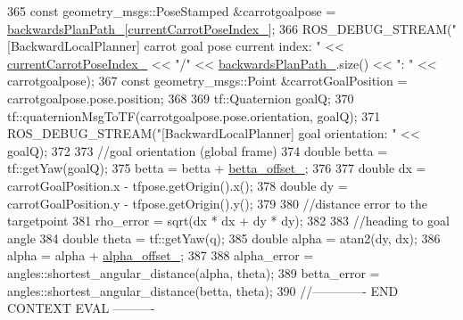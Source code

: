 \begin{DoxyCode}
365                 \textcolor{keyword}{const} geometry\_msgs::PoseStamped &carrotgoalpose = 
      \hyperlink{classcl__move__base__z_1_1backward__local__planner_1_1BackwardLocalPlanner_ad9cde5c85f782cab2ddb4030e3c3f2cf}{backwardsPlanPath\_}[\hyperlink{classcl__move__base__z_1_1backward__local__planner_1_1BackwardLocalPlanner_a2e8f2b78bc97f27c5fa431f3af2261ed}{currentCarrotPoseIndex\_}];
366                 ROS\_DEBUG\_STREAM(\textcolor{stringliteral}{"[BackwardLocalPlanner] carrot goal pose current index: "} << 
      \hyperlink{classcl__move__base__z_1_1backward__local__planner_1_1BackwardLocalPlanner_a2e8f2b78bc97f27c5fa431f3af2261ed}{currentCarrotPoseIndex\_} << \textcolor{stringliteral}{"/"} << \hyperlink{classcl__move__base__z_1_1backward__local__planner_1_1BackwardLocalPlanner_ad9cde5c85f782cab2ddb4030e3c3f2cf}{backwardsPlanPath\_}.size() << \textcolor{stringliteral}{": 
      "} << carrotgoalpose);
367                 \textcolor{keyword}{const} geometry\_msgs::Point &carrotGoalPosition = carrotgoalpose.pose.position;
368 
369                 tf::Quaternion goalQ;
370                 tf::quaternionMsgToTF(carrotgoalpose.pose.orientation, goalQ);
371                 ROS\_DEBUG\_STREAM(\textcolor{stringliteral}{"[BackwardLocalPlanner] goal orientation: "} << goalQ);
372 
373                 \textcolor{comment}{//goal orientation (global frame)}
374                 \textcolor{keywordtype}{double} betta = tf::getYaw(goalQ);
375                 betta = betta + \hyperlink{classcl__move__base__z_1_1backward__local__planner_1_1BackwardLocalPlanner_a07e5f16f6951cca1e6d3483f345d0bb1}{betta\_offset\_};
376 
377                 \textcolor{keywordtype}{double} dx = carrotGoalPosition.x - tfpose.getOrigin().x();
378                 \textcolor{keywordtype}{double} dy = carrotGoalPosition.y - tfpose.getOrigin().y();
379 
380                 \textcolor{comment}{//distance error to the targetpoint}
381                 rho\_error = sqrt(dx * dx + dy * dy);
382 
383                 \textcolor{comment}{//heading to goal angle}
384                 \textcolor{keywordtype}{double} theta = tf::getYaw(q);
385                 \textcolor{keywordtype}{double} alpha = atan2(dy, dx);
386                 alpha = alpha + \hyperlink{classcl__move__base__z_1_1backward__local__planner_1_1BackwardLocalPlanner_a09765b08935d9355447c44776e1b1c3a}{alpha\_offset\_};
387 
388                 alpha\_error = angles::shortest\_angular\_distance(alpha, theta);
389                 betta\_error = angles::shortest\_angular\_distance(betta, theta);
390             \textcolor{comment}{//------------- END CONTEXT EVAL ----------}

\end{DoxyCode}
